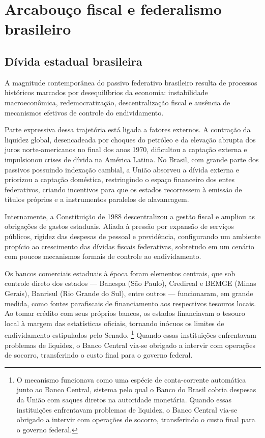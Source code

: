 \chapter{Arcabouço fiscal e federalismo brasileiro}
\label{chap:institucional}
\section{Dívida estadual brasileira}
\label{sec:crise_estadual}

A magnitude contemporânea do passivo federativo brasileiro resulta de processos históricos marcados por desequilíbrios da economia: instabilidade macroeconômica, redemocratização, descentralização fiscal e ausência de mecanismos efetivos de controle do endividamento.

Parte expressiva dessa trajetória está ligada a fatores externos. A contração da liquidez global, desencadeada por choques do petróleo e da elevação abrupta dos juros norte-americanos no final dos anos 1970, dificultou a captação externa e impulsionou crises de dívida na América Latina. No Brasil, com grande parte dos passivos possuindo indexação cambial, a União absorveu a dívida externa e priorizou a captação doméstica, restringindo o espaço financeiro dos entes federativos, criando incentivos para que os estados recorressem à emissão de títulos próprios e a instrumentos paralelos de alavancagem.

Internamente, a Constituição de 1988 descentralizou a gestão fiscal e ampliou as obrigações de gastos estaduais. Aliada à pressão por expansão de serviços públicos, rigidez das despesas de pessoal e previdência, configurando um ambiente propício ao crescimento das dívidas fiscais federativas, sobretudo em um cenário com poucos mecanismos formais de controle ao endividamento.

Os bancos comerciais estaduais à época foram elementos centrais, que sob controle direto dos estados --- Banespa (São Paulo), Credireal e BEMGE (Minas Gerais), Banrisul (Rio Grande do Sul), entre outros --- funcionaram, em grande medida, como fontes parafiscais de financiamento aos respectivos tesouros locais. Ao tomar crédito com seus próprios bancos, os estados financiavam o tesouro local à margem das estatísticas oficiais, tornando inócuos os limites de endividamento estipulados pelo Senado. \footnote{O mecanismo funcionava como uma espécie de conta-corrente automática junto ao Banco Central, sistema pelo qual o Banco do Brasil cobria despesas da União com saques diretos na autoridade monetária. Quando essas instituições enfrentavam problemas de liquidez, o Banco Central via-se obrigado a intervir com operações de socorro, transferindo o custo final para o governo federal.} Quando essas instituições enfrentavam problemas de liquidez, o Banco Central via-se obrigado a intervir com operações de socorro, transferindo o custo final para o governo federal.

